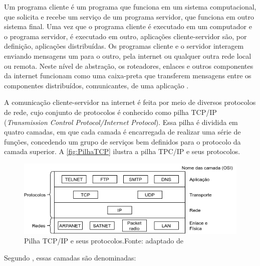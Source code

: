 Um programa cliente é um programa que funciona em um sistema computacional, que solicita e recebe um serviço de um programa servidor, que funciona em outro sistema final. Uma vez que o programa cliente é executado em um computador e o programa servidor, é executado em outro, aplicações cliente-servidor são, por definição, aplicações distribuídas. Os programas cliente e o servidor interagem enviando mensagens um para o outro, pela internet ou qualquer outra rede local ou remota. Neste nível de abstração, os roteadores, enlaces e outros componentes da internet funcionam como uma caixa-preta que transferem mensagens entre os componentes distribuídos, comunicantes, de uma aplicação \cite{Kurose2010}.

A comunicação cliente-servidor na internet é feita por meio de diversos protocolos de rede, cujo conjunto de protocolos é conhecido como pilha TCP/IP (\textit{Transmission Control Protocol/Internet Protocol}). Essa pilha é dividida em quatro camadas, em que cada camada é encarregada de realizar uma série de funções, concedendo um grupo de serviços bem definidos para o protocolo da camada superior. A \autoref{fig:PilhaTCP} ilustra a pilha TPC/IP e seus protocolos. 

\begin{figure}[H]
    \scriptsize
     \centering
     \includegraphics[scale=0.8]{dados/figuras/PilhaTCP-IP.png}
     \caption{Pilha TCP/IP e seus protocolos.\newline Fonte: adaptado de \cite{tanenbaumRedes}}
     \label{fig:PilhaTCP}
\end{figure}

Segundo , essas camadas são denominadas:


